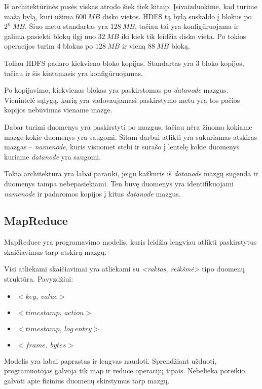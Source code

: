 \documentclass[10pt]{IEEEtran}
\begin{document}
		Iš architektūrinės pusės viskas atrodo šiek tiek kitaip. Įsivaizduokime, kad turime mažą bylą, kuri užima $600~MB$ disko vietos. HDFS tą bylą suskaldo į blokus po $2^n~MB$. Šiuo metu standartas yra $128~MB$, tačiau tai yra konfigūruojama ir galima pasiekti blokų ilgį nuo $32~MB$ iki kiek tik leidžia disko vieta. Po tokios operacijos turim 4 blokus po $128~MB$ ir vieną $88~MB$ bloką.

		Toliau HDFS padaro kiekvieno bloko kopijas. Standartas yra 3 bloko kopijos, tačiau ir šis kintamasis yra konfigūruojamas.

		Po kopijavimo, kiekvienas blokas yra paskirstomas po \textit{datanode} mazgus. Vienintelė sąlygą, kurią yra vadovaujamasi paskirstymo metu yra tos pačios kopijos nebūvimas viename mazge.

		Dabar turimi duomenys yra paskirstyti po mazgus, tačiau nėra žinoma kokiame mazge kokie duomenys yra saugomi. Šitam darbui atlikti yra sukuriamas atskiras mazgas -- \textit{namenode}, kuris visuomet stebi ir surašo į lentelę kokie duomenys kuriame \textit{datanode} yra saugomi.

		Tokia architektūra yra labai paranki, jeigu kažkuris iš \textit{datanode} mazgų sugenda ir duomenys tampa nebepasiekiami. Ten buvę duomenys yra identifikuojami \textit{namenode} ir padaromos kopijos į kitus \textit{datanode} mazgus.

	\subsection{MapReduce}

		MapReduce yra programavimo modelis, kuris leidžia lengviau atlikti paskirstytus skaičiavimus tarp atskirų mazgų.

		Visi atliekami skaičiavimai yra atliekami su \textit{<raktas, reikšmė>} tipo duomenų struktūra. Pavyzdžiui:

		\begin{itemize}
			\item $<key,~value>$
			\item $<timestamp,~action>$
			\item $<timestamp,~log~entry>$
			\item $<frame,~bytes>$
		\end{itemize}

		Modelis yra labai paprastas ir lengvas naudoti. Sprendžiant užduoti, programuotojas galvoja tik map ir reduce operacijų tipais. Nebelieka poreikio galvoti apie fizinius duomenų skirstymus tarp mazgų.
\end{document}
